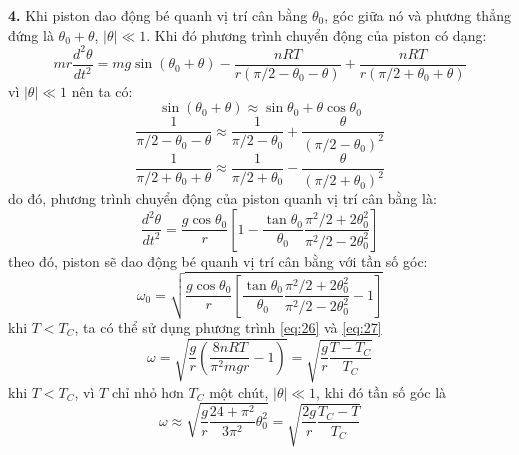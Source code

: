 \noindent\textbf{4.} Khi piston dao động bé quanh vị trí cân bằng $\theta_{0}$, góc giữa nó và phương thẳng đứng là $\theta_{0}+\theta$, $\lvert\theta\rvert\ll 1$. Khi đó phương trình chuyển động của piston có dạng:
\begin{equation}
  \label{eq:214}
  mr\frac{d^{2}\theta}{dt^{2}}=mg\sin(\theta_{0}+\theta)-\frac{nRT}{r(\pi/2-\theta_{0}-\theta)}+\frac{nRT}{r(\pi/2+\theta_{0}+\theta)}
\end{equation}
vì $\lvert\theta\rvert\ll 1$ nên ta có:
\begin{equation}
  \label{eq:215}
  \sin(\theta_{0}+\theta)\approx\sin\theta_{0}+\theta\cos\theta_{0}
\end{equation}
\begin{equation}
  \label{eq:216}
  \frac{1}{\pi/2-\theta_{0}-\theta}\approx\frac{1}{\pi/2-\theta_{0}}+\frac{\theta}{(\pi/2-\theta_{0})^{2}}
\end{equation}
\begin{equation}
  \label{eq:217}
  \frac{1}{\pi/2+\theta_{0}+\theta}\approx\frac{1}{\pi/2+\theta_{0}}-\frac{\theta}{(\pi/2+\theta_{0})^{2}}
\end{equation}
do đó, phương trình chuyển động của piston quanh vị trí cân bằng là:
\begin{equation}
  \label{eq:218}
  \frac{d^{2}\theta}{dt^{2}}=\frac{g\cos\theta_{0}}{r}\left[1-\frac{\tan\theta_{0}}{\theta_{0}}\frac{\pi^{2}/2+2\theta_{0}^{2}}{\pi^{2}/2-2\theta_{0}^{2}}\right]
\end{equation}
theo đó, piston sẽ dao động bé quanh vị trí cân bằng với tần số góc:
\begin{equation}
  \label{eq:219}
  \omega_{0}=\sqrt{\frac{g\cos\theta_{0}}{r}\left[\frac{\tan\theta_{0}}{\theta_{0}}\frac{\pi^{2}/2+2\theta_{0}^{2}}{\pi^{2}/2-2\theta_{0}^{2}}-1\right]}
\end{equation}
khi $T<T_{C}$, ta có thể sử dụng phương trình \eqref{eq:26} và \eqref{eq:27}
\begin{equation}
  \label{eq:220}
  \omega=\sqrt{\frac{g}{r}\left(\frac{8nRT}{\pi^{2}mgr}-1\right)}=\sqrt{\frac{g}{r}\frac{T-T_{C}}{T_{C}}}
\end{equation}
khi $T<T_{C}$, vì $T$ chỉ nhỏ hơn $T_{C}$ một chút, $\lvert\theta\rvert\ll 1$, khi đó tần số góc là
\begin{equation}
  \label{eq:221}
  \omega\approx\sqrt{\frac{g}{r}\frac{24+\pi^{2}}{3\pi^{2}}\theta_{0}^{2}}=\sqrt{\frac{2g}{r}\frac{T_{C}-T}{T_{C}}}
\end{equation}

